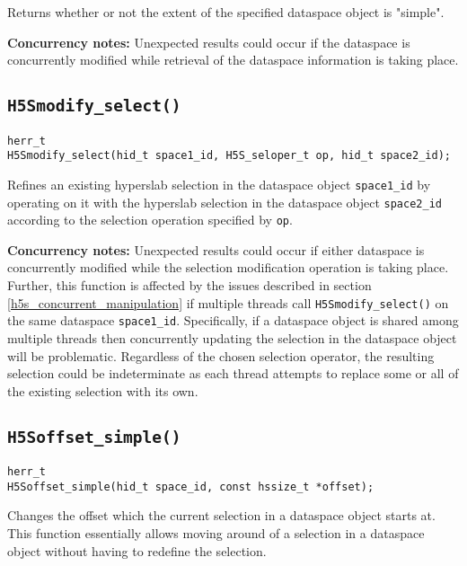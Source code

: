 \documentclass[../HDF5_RFC.tex]{subfiles}
\begin{document}
Returns whether or not the extent of the specified dataspace object is "simple".

\textbf{Concurrency notes:} Unexpected results could occur if the dataspace is concurrently modified
while retrieval of the dataspace information is taking place.

\subsection{\texttt{H5Smodify\_select()}}
\label{apdx:h5s_func_h5smodify_select}

\begin{verbatim}
herr_t
H5Smodify_select(hid_t space1_id, H5S_seloper_t op, hid_t space2_id);
\end{verbatim}

Refines an existing hyperslab selection in the dataspace object \texttt{space1\_id} by operating
on it with the hyperslab selection in the dataspace object \texttt{space2\_id} according to the
selection operation specified by \texttt{op}.

\textbf{Concurrency notes:} Unexpected results could occur if either dataspace is concurrently
modified while the selection modification operation is taking place. Further, this function is
affected by the issues described in section \ref{h5s_concurrent_manipulation} if multiple threads
call \texttt{H5Smodify\_select()} on the same dataspace \texttt{space1\_id}. Specifically, if a 
dataspace object is shared among multiple threads then concurrently updating the selection in
the dataspace object will be problematic. Regardless of the chosen selection operator, the
resulting selection could be indeterminate as each thread attempts to replace some or all of
the existing selection with its own.

\subsection{\texttt{H5Soffset\_simple()}}
\label{apdx:h5s_func_h5soffset_simple}

\begin{verbatim}
herr_t
H5Soffset_simple(hid_t space_id, const hssize_t *offset);
\end{verbatim}

Changes the offset which the current selection in a dataspace object starts at. This function
essentially allows moving around of a selection in a dataspace object without having to
redefine the selection.
\end{document}
